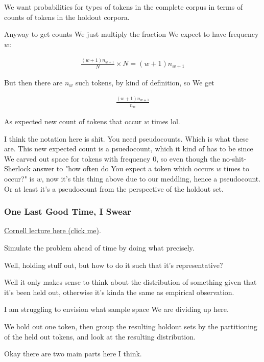 \documentclass{article}
\begin{document}
			We want probabilities for types of tokens in the complete corpus in terms of counts of tokens in the holdout corpora.
			
			Anyway to get counts We just multiply the fraction We expect to have frequency $w$:
			
			\begin{align}
				\frac{(w+1)n_{w+1}}{N}\times N = (w+1)n_{w+1}
			\end{align}
			
			But then there are $n_w$ such tokens, by kind of definition, so We get
			
			\begin{align}
				\frac{(w+1)n_{w+1}}{n_w}
			\end{align}
			
			As expected new count of tokens that occur $w$ times lol.
			
			I think the notation here is shit. You need pseudocounts. Which is what these are. This new expected count is a psuedocount, which it kind of has to be since We carved out space for tokens with frequency 0, so even though the no-shit-Sherlock answer to "how often do You expect a token which occurs $w$ times to occur?" is $w$, now it's this thing above due to our meddling, hence a pseudocount. Or at least it's a pseudocount from the perspective of the holdout set.
			
		\subsubsection{One Last Good Time, I Swear}
		
			\href{http://www.cs.cornell.edu/courses/cs6740/2010sp/guides/lec11.pdf}{Cornell lecture here (click me)}.
		
			Simulate the problem ahead of time by doing what precisely.
			
			Well, holding stuff out, but how to do it such that it's representative? 
			
			Well it only makes sense to think about the distribution of something given that it's been held out, otherwise it's kinda the same as empirical observation.
			
			I am struggling to envision what sample space We are dividing up here. 
			
			We hold out one token, then group the resulting holdout sets by the partitioning of the held out tokens, and look at the resulting distribution.
			
			Okay there are two main parts here I think.
			
\end{document}
